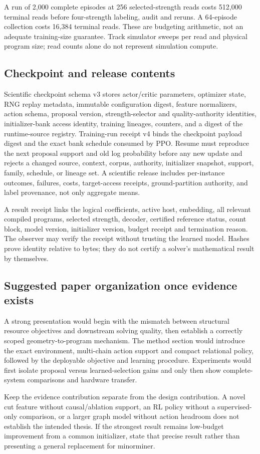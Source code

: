 A run of 2,000 complete episodes at 256 selected-strength reads costs 512,000 terminal reads before four-strength labeling, audit and reruns. A 64-episode collection costs 16,384 terminal reads. These are budgeting arithmetic, not an adequate training-size guarantee. Track simulator sweeps per read and physical program size; read counts alone do not represent simulation compute.

\subsection{Checkpoint and release contents}
Scientific checkpoint schema v3 stores actor/critic parameters, optimizer state, RNG replay metadata, immutable configuration digest, feature normalizers, action schema, proposal version, strength-selector and quality-authority identities, initializer-bank access identity, training lineages, counters, and a digest of the runtime-source registry. Training-run receipt v4 binds the checkpoint payload digest and the exact bank schedule consumed by PPO. Resume must reproduce the next proposal support and old log probability before any new update and rejects a changed source, context, corpus, authority, initializer snapshot, support, family, schedule, or lineage set. A scientific release includes per-instance outcomes, failures, costs, target-access receipts, ground-partition authority, and label provenance, not only aggregate means.

A result receipt links the logical coefficients, active host, embedding, all relevant compiled programs, selected strength, decoder, certified reference status, count block, model version, initializer version, budget receipt and termination reason. The observer may verify the receipt without trusting the learned model. Hashes prove identity relative to bytes; they do not certify a solver's mathematical result by themselves.

\subsection{Suggested paper organization once evidence exists}
A strong presentation would begin with the mismatch between structural resource objectives and downstream solving quality, then establish a correctly scoped geometry-to-program mechanism. The method section would introduce the exact environment, multi-chain action support and compact relational policy, followed by the deployable objective and learning procedure. Experiments would first isolate proposal versus learned-selection gains and only then show complete-system comparisons and hardware transfer.

Keep the evidence contribution separate from the design contribution. A novel cut feature without causal/ablation support, an RL policy without a supervised-only comparison, or a larger graph model without action headroom does not establish the intended thesis. If the strongest result remains low-budget improvement from a common initializer, state that precise result rather than presenting a general replacement for minorminer.
